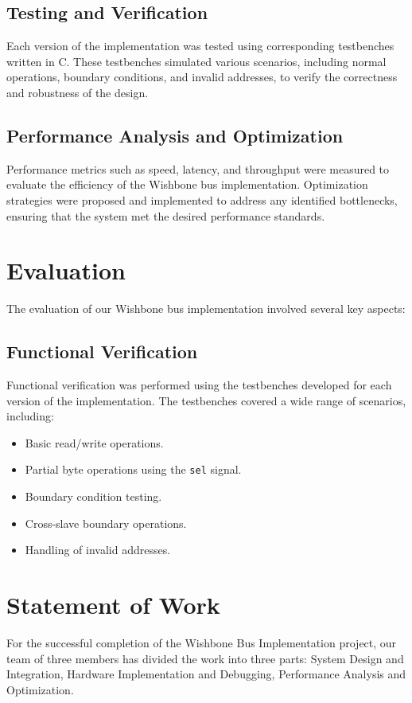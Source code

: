 \documentclass[12pt]{report}
\begin{document}
\subsection{Testing and Verification}
Each version of the implementation was tested using corresponding testbenches written in C. These testbenches simulated various scenarios, including normal operations, boundary conditions, and invalid addresses, to verify the correctness and robustness of the design.

\subsection{Performance Analysis and Optimization}
Performance metrics such as speed, latency, and throughput were measured to evaluate the efficiency of the Wishbone bus implementation. Optimization strategies were proposed and implemented to address any identified bottlenecks, ensuring that the system met the desired performance standards.




\section{Evaluation}

The evaluation of our Wishbone bus implementation involved several key aspects:

\subsection{Functional Verification}
Functional verification was performed using the testbenches developed for each version of the implementation. The testbenches covered a wide range of scenarios, including:
\begin{itemize}
    \item Basic read/write operations.
    \item Partial byte operations using the \texttt{sel} signal.
    \item Boundary condition testing.
    \item Cross-slave boundary operations.
    \item Handling of invalid addresses.
\end{itemize}




\section{Statement of Work}
For the successful completion of the Wishbone Bus Implementation project, our team of three members has divided the work into three parts: System Design and Integration, Hardware Implementation and Debugging, Performance Analysis and Optimization.
\end{document}
